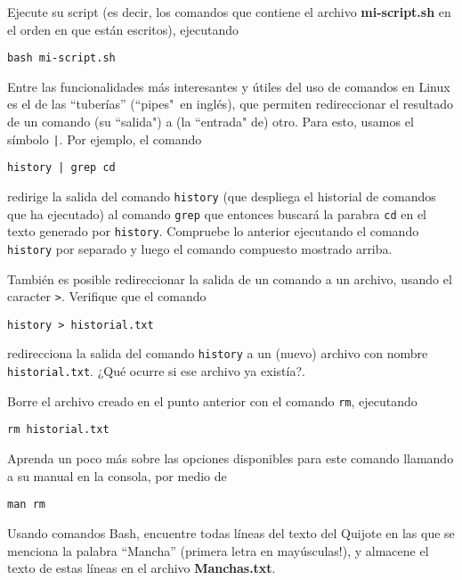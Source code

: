 \documentclass[11pt]{exam}
\begin{document}
\begin{questions}
\begin{parts}
\item Ejecute su script (es decir, los comandos que contiene el archivo \textbf{mi-script.sh} en el orden en que están escritos), ejecutando 

\begin{verbatim}
bash mi-script.sh
\end{verbatim}
\end{parts}


\item Entre las funcionalidades más interesantes y útiles del uso de comandos en Linux es el de las ``tuberías'' (``pipes"\ en inglés), que permiten redireccionar el resultado de un comando (su ``salida") a (la ``entrada" de) otro. Para esto, usamos el símbolo \texttt{|}. Por ejemplo, el comando
\begin{verbatim}
history | grep cd
\end{verbatim}
redirige la salida del comando \texttt{history} (que despliega el historial de comandos que ha ejecutado) al comando \texttt{grep} que entonces buscará la parabra \texttt{cd} en el texto generado por \texttt{history}. Compruebe lo anterior ejecutando el comando \texttt{history} por separado y luego el comando compuesto mostrado arriba.

\item También es posible redireccionar la salida de un comando a un archivo, usando el caracter \texttt{>}. Verifique que el comando
\begin{verbatim}
history > historial.txt
\end{verbatim}
redirecciona la salida del comando \texttt{history} a un (nuevo) archivo con nombre \texttt{historial.txt}. ¿Qué ocurre si ese archivo ya existía?.

\item Borre el archivo creado en el punto anterior con el comando \texttt{rm}, ejecutando
\begin{verbatim}
rm historial.txt
\end{verbatim}
Aprenda un poco más sobre las opciones disponibles para este comando llamando a su manual en la consola, por medio de
\begin{verbatim}
man rm
\end{verbatim}


\item Usando comandos Bash, encuentre todas líneas del texto del Quijote en las que se menciona la palabra ``Mancha'' (primera letra en mayúsculas!), y almacene el texto de estas líneas en el archivo \textbf{Manchas.txt}.


\end{questions}
\end{document}

